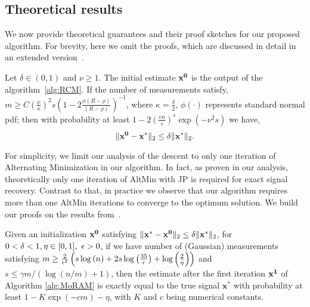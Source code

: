 \subsection{Theoretical results}
We now provide theoretical guarantees and their proof sketches for our proposed algorithm. For brevity, here we omit the proofs, which are discussed in detail in an extended version~\cite{shahhegde}. %
\begin{theorem}
	Let $\delta \in (0,1)$ and $\nu \geq 1$. The initial estimate $\mathbf{x^0}$ is the output of the algorithm~\ref{alg:RCM}. If the number of measurements satisfy, $m \geq C(\frac{\nu}{\kappa})^2s\left(1-2\frac{\phi(R-\rho)}{(R-\rho)} \right)^{-1}$, where $\kappa = \frac{\delta}{2}$, $\phi(\cdot)$ represents standard normal pdf; then with probability at least $1 - 2\left(\frac{en}{s}\right)^s\exp\left(-\nu^2s\right)$ we have,
	$$
	\|\mathbf{x^0} - \mathbf{x^*}\|_2 \leq \delta \|\mathbf{x^*}\|_2.
	$$
	\label{th:1}
\end{theorem}
\vspace{-2em}
For simplicity, we limit our analysis of the descent to only one iteration of Alternating Minimization in our algorithm. In fact, as proven in our analysis, theoretically only one iteration of AltMin with JP is required for exact signal recovery. Contrast to that, in practice we observe that our algorithm requires more than one AltMin iterations to converge to the optimum solution. We build our proofs on the results from~\cite{vershynin2010introduction,li2013compressed,Jacques2013}.
\begin{theorem}
	Given an initialization $\mathbf{x^0}$ satisfying $\|\mathbf{x^* - x^0}\|_2 \leq \delta\|\mathbf{x^*}\|_2$, for $0 < \delta < 1, \eta \in [0,1],~\epsilon > 0$, if we have number of (Gaussian) measurements satisfying $m \geq \frac{2}{\epsilon^2}\left(s\log{(n)} + 2s\log{\left(\frac{35}{\epsilon}\right)}+\log{\left(\frac{2}{\eta}\right)}\right)$ and $s \leq \gamma m/\left(\log\left(n/m\right)+1\right)$, then the estimate after the first iteration $\mathbf{x^1}$ of Algorithm \ref{alg:MoRAM} is exactly equal to the true signal $\mathbf{x^*}$ with probability at least $1-K\exp(-cm)-\eta$, with $K$ and $c$ being numerical constants.
	\label{th:2}
\end{theorem}
